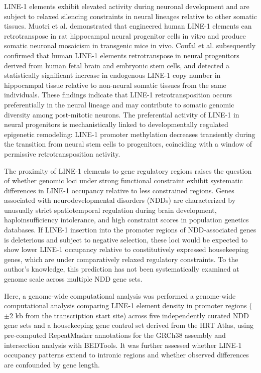 \documentclass[11pt, a4paper]{article}
\begin{document}
LINE-1 elements exhibit elevated activity during neuronal
development and are subject to relaxed silencing constraints
in neural lineages relative to other somatic tissues.
Muotri et al. demonstrated that engineered human LINE-1 elements can
retrotranspose in rat hippocampal neural progenitor cells in
vitro and produce somatic neuronal mosaicism in transgenic mice
in vivo\cite{muotri2005}.
Coufal et al. subsequently confirmed
that human LINE-1 elements retrotranspose in neural progenitors
derived from human fetal brain and embryonic stem cells, and
detected a statistically significant increase in endogenous
LINE-1 copy number in hippocampal tissue relative to non-neural
somatic tissues from the same individuals\cite{coufal2009}.
These findings indicate that LINE-1 retrotransposition occurs
preferentially in the neural lineage and may contribute to
somatic genomic diversity among post-mitotic neurons\cite{singer2010}.
The preferential activity of LINE-1 in neural progenitors is
mechanistically linked to developmentally regulated epigenetic
remodeling: LINE-1 promoter methylation decreases transiently
during the transition from neural stem cells to progenitors,
coinciding with a window of permissive retrotransposition
activity\cite{muotri2005, jonsson2019}.

The proximity of LINE-1 elements to gene regulatory regions
raises the question of whether genomic loci under strong
functional constraint exhibit systematic differences in LINE-1
occupancy relative to less constrained regions. Genes
associated with neurodevelopmental disorders (NDDs) are
characterized by unusually strict spatiotemporal regulation
during brain development, haploinsufficiency intolerance, and
high constraint scores in population genetics databases.
If LINE-1 insertion into the promoter regions of NDD-associated
genes is deleterious and subject to negative selection, these
loci would be expected to show lower LINE-1 occupancy relative
to constitutively expressed housekeeping genes, which are under
comparatively relaxed regulatory constraints.
To the author's knowledge, this prediction has not been systematically examined at genome
scale across multiple NDD gene sets.

Here, a genome-wide computational analysis was performed a genome-wide 
computational analysis comparing LINE-1 element
density in promoter regions ($\pm$2 kb from the transcription
start site) across five independently curated NDD gene sets and
a housekeeping gene control set derived from the HRT Atlas,
using pre-computed RepeatMasker annotations for the GRCh38
assembly and intersection analysis with BEDTools.
It was further assessed whether LINE-1 occupancy patterns extend to intronic
regions and whether observed differences are confounded by
gene length.
\end{document}
